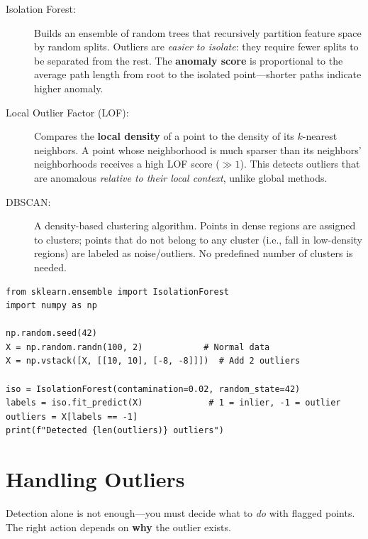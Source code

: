 \begin{description}
    \item[Isolation Forest:] Builds an ensemble of random trees that recursively partition feature space by random splits. Outliers are \textit{easier to isolate}: they require fewer splits to be separated from the rest. The \textbf{anomaly score} is proportional to the average path length from root to the isolated point---shorter paths indicate higher anomaly.
    \item[Local Outlier Factor (LOF):] Compares the \textbf{local density} of a point to the density of its $k$-nearest neighbors. A point whose neighborhood is much sparser than its neighbors' neighborhoods receives a high LOF score ($\gg 1$). This detects outliers that are anomalous \textit{relative to their local context}, unlike global methods.
    \item[DBSCAN:] A density-based clustering algorithm. Points in dense regions are assigned to clusters; points that do not belong to any cluster (i.e., fall in low-density regions) are labeled as noise/outliers. No predefined number of clusters is needed.
\end{description}

\begin{lstlisting}[style=pythonstyle]
from sklearn.ensemble import IsolationForest
import numpy as np

np.random.seed(42)
X = np.random.randn(100, 2)            # Normal data
X = np.vstack([X, [[10, 10], [-8, -8]]])  # Add 2 outliers

iso = IsolationForest(contamination=0.02, random_state=42)
labels = iso.fit_predict(X)             # 1 = inlier, -1 = outlier
outliers = X[labels == -1]
print(f"Detected {len(outliers)} outliers")
\end{lstlisting}


\section*{Handling Outliers}

Detection alone is not enough---you must decide what to \textit{do} with flagged points. The right action depends on \textbf{why} the outlier exists.

